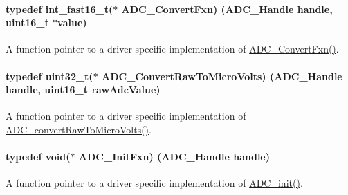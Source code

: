 \paragraph[{A\+D\+C\+\_\+\+Convert\+Fxn}]{\setlength{\rightskip}{0pt plus 5cm}typedef int\+\_\+fast16\+\_\+t($\ast$ A\+D\+C\+\_\+\+Convert\+Fxn) ({\bf A\+D\+C\+\_\+\+Handle} handle, uint16\+\_\+t $\ast$value)}\label{_a_d_c_8h_a552f2f752fbfc1b2af7551e55e392a42}


A function pointer to a driver specific implementation of \hyperlink{_a_d_c_8h_a552f2f752fbfc1b2af7551e55e392a42}{A\+D\+C\+\_\+\+Convert\+Fxn()}. 

\paragraph[{A\+D\+C\+\_\+\+Convert\+Raw\+To\+Micro\+Volts}]{\setlength{\rightskip}{0pt plus 5cm}typedef uint32\+\_\+t($\ast$ A\+D\+C\+\_\+\+Convert\+Raw\+To\+Micro\+Volts) ({\bf A\+D\+C\+\_\+\+Handle} handle, uint16\+\_\+t raw\+Adc\+Value)}\label{_a_d_c_8h_ab1b64068b8e0e3a26fa4b470cff92bf7}


A function pointer to a driver specific implementation of \hyperlink{_a_d_c_8h_a81e762c06c3957c01d3271bdecef358d}{A\+D\+C\+\_\+convert\+Raw\+To\+Micro\+Volts()}. 

\paragraph[{A\+D\+C\+\_\+\+Init\+Fxn}]{\setlength{\rightskip}{0pt plus 5cm}typedef void($\ast$ A\+D\+C\+\_\+\+Init\+Fxn) ({\bf A\+D\+C\+\_\+\+Handle} handle)}\label{_a_d_c_8h_af5f90e5268e88d0bb56d40d53542b1da}


A function pointer to a driver specific implementation of \hyperlink{_a_d_c_8h_a4b4a2ddcb45df0c8497c47d4ed800e2a}{A\+D\+C\+\_\+init()}. 


